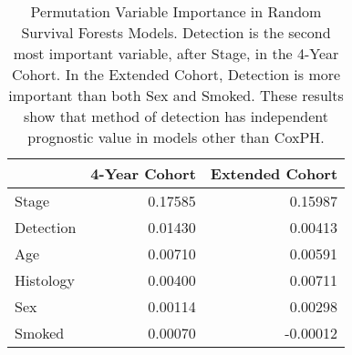 \begin{table}

\caption{\label{tab:unnamed-chunk-31}Permutation Variable Importance in Random Survival Forests Models. Detection is the second most important variable, after Stage, in the 4-Year Cohort. In the Extended Cohort, Detection is more important than both Sex and Smoked. These results show that method of detection has independent prognostic value in models other than CoxPH.\label{tab:varimp}}
\centering
\begin{tabular}[t]{lrr}
\toprule
  & 4-Year Cohort & Extended Cohort\\
\midrule
Stage & 0.17585 & 0.15987\\
Detection & 0.01430 & 0.00413\\
Age & 0.00710 & 0.00591\\
Histology & 0.00400 & 0.00711\\
Sex & 0.00114 & 0.00298\\
\addlinespace
Smoked & 0.00070 & -0.00012\\
\bottomrule
\end{tabular}
\end{table}

